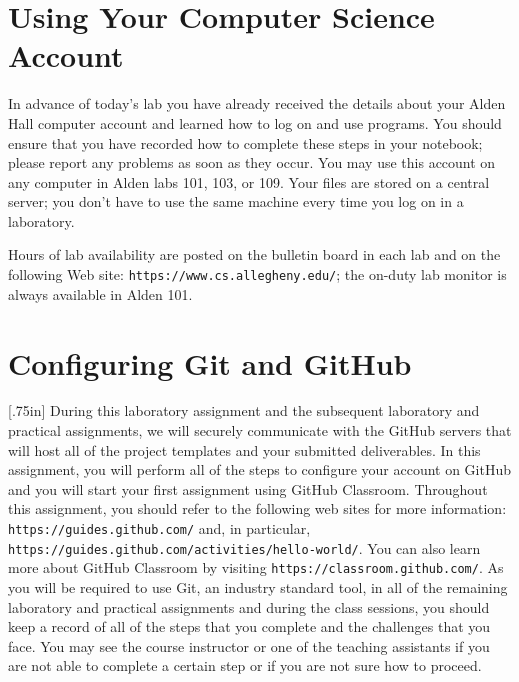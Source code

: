 \documentclass[11pt]{article}
\newcommand{\url}[1]{\lstinline{#1}}
\newcommand{\resource}[1]{\null\hfill\LARGE{\faLink{}}\newline\scriptsize{\em{#1}}}
\begin{document}
\section*{Using Your Computer Science Account}

In advance of today's lab you have already received the details about your
Alden Hall computer account and learned how to log on and use programs. You
should ensure that you have recorded how to complete these steps in your
notebook; please report any problems as soon as they occur. You may use this
account on any computer in Alden labs 101, 103, or 109. Your files are stored
on a central server; you don't have to use the same machine every time you log
on in a laboratory.

Hours of lab availability are posted on the bulletin board in each lab and on
the following Web site: \url{https://www.cs.allegheny.edu/}; the on-duty lab
monitor is always available in Alden 101.

\section*{Configuring Git and GitHub}

\marginnote{\resource{Learn about GitHub}}[.75in] During this laboratory
assignment and the subsequent laboratory and practical assignments, we will
securely communicate with the GitHub servers that will host all of the project
templates and your submitted deliverables. In this assignment, you will perform
all of the steps to configure your account on GitHub and you will start your
first assignment using GitHub Classroom. Throughout this assignment, you should
refer to the following web sites for more information:
\url{https://guides.github.com/} and, in particular,
\url{https://guides.github.com/activities/hello-world/}. You can also learn
more about GitHub Classroom by visiting \url{https://classroom.github.com/}. As
you will be required to use Git, an industry standard tool, in all of the
remaining laboratory and practical assignments and during the class sessions,
you should keep a record of all of the steps that you complete and the
challenges that you face. You may see the course instructor or one of the
teaching assistants if you are not able to complete a certain step or if you
are not sure how to proceed.
\end{document}
